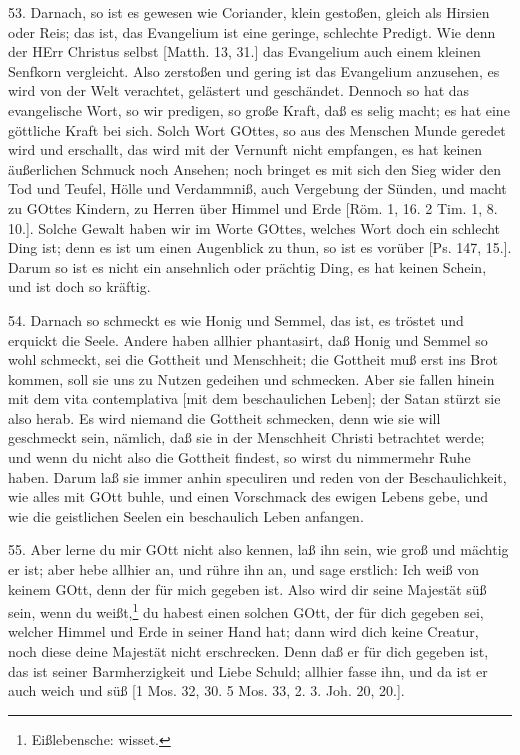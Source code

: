 53. Darnach, so ist es gewesen wie Coriander, klein gestoßen, gleich als Hirsien oder Reis; das ist, das Evangelium ist eine geringe, schlechte Predigt. Wie denn der HErr Christus selbst [Matth. 13, 31.] das Evangelium auch einem kleinen Senfkorn vergleicht. Also zerstoßen und gering ist das Evangelium anzusehen, es wird von der Welt verachtet, gelästert und geschändet. Dennoch so hat das evangelische Wort, so wir predigen, so große Kraft, daß es selig macht; es hat eine göttliche Kraft bei sich. Solch Wort GOttes, so aus des Menschen Munde geredet wird und erschallt, das wird mit der Vernunft nicht empfangen, es hat keinen äußerlichen Schmuck noch Ansehen; noch bringet es mit sich den Sieg wider den Tod und Teufel, Hölle und Verdammniß, auch Vergebung der Sünden, und macht zu GOttes Kindern, zu Herren über Himmel und Erde [Röm. 1, 16. 2 Tim. 1, 8. 10.]. Solche Gewalt haben wir im Worte GOttes, welches Wort doch ein schlecht Ding ist; denn es ist um einen Augenblick zu thun, so ist es vorüber [Ps. 147, 15.]. Darum so ist es nicht ein ansehnlich oder prächtig Ding, es hat keinen Schein, und ist doch so kräftig.

54. Darnach so schmeckt es wie Honig und Semmel, das ist, es tröstet und erquickt die Seele. Andere haben allhier phantasirt, daß Honig und Semmel so wohl schmeckt, sei die Gottheit und Menschheit; die Gottheit muß erst ins Brot kommen, soll sie uns zu Nutzen gedeihen und schmecken. Aber sie fallen hinein mit dem vita contemplativa [mit dem beschaulichen Leben]; der Satan stürzt sie also herab. Es wird niemand die Gottheit schmecken, denn wie sie will geschmeckt sein, nämlich, daß sie in der Menschheit Christi betrachtet werde; und wenn du nicht also die Gottheit findest, so wirst du nimmermehr Ruhe haben. Darum laß sie immer anhin speculiren und reden von der Beschaulichkeit, wie alles mit GOtt buhle, und einen Vorschmack des ewigen Lebens gebe, und wie die geistlichen Seelen ein beschaulich Leben anfangen.

55. Aber lerne du mir GOtt nicht also kennen, laß ihn sein, wie groß und mächtig er ist; aber hebe allhier an, und rühre ihn an, und sage erstlich: Ich weiß von keinem GOtt, denn der für mich gegeben ist. Also wird dir seine Majestät süß sein, wenn du weißt,\footnote{Eißlebensche: wisset.} du habest einen solchen GOtt, der für dich gegeben sei, welcher Himmel und Erde in seiner Hand hat; dann wird dich keine Creatur, noch diese deine Majestät nicht erschrecken. Denn daß er für dich gegeben ist, das ist seiner Barmherzigkeit und Liebe Schuld; allhier fasse ihn, und da ist er auch weich und süß [1 Mos. 32, 30. 5 Mos. 33, 2. 3. Joh. 20, 20.].

